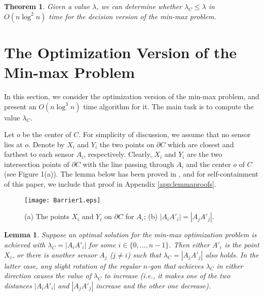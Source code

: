 \documentclass[11pt]{article}
\newtheorem{Theo}{Theorem}
\newtheorem{Lem}{Lemma}
\begin{document}
\begin{Theo}\label{theo:20}
Given a value $\lambda$, we can determine whether
$\lambda_C\leq\lambda$ in $O(n\log^2 n)$ time for the decision version
of the min-max problem.
\end{Theo}

\section{The Optimization Version of the Min-max Problem}
\label{sec:optimization}

In this section, we consider the optimization version of the min-max
problem, and present an $O(n\log^3 n)$ time algorithm for it.
The main task is to compute the value $\lambda_C$.

Let $o$ be the center of $C$. For simplicity of discussion, we assume that no sensor
lies at $o$.
Denote by $X_{i}$ and $Y_i$ the two points on $\partial C$ which are closest
and farthest to each sensor $A_{i}$, respectively.
Clearly, $X_{i}$ and $Y_i$ are the two intersection
points of $\partial C$ with the line passing through $A_{i}$ and the center $o$
of $C$ (see Figure 1(a)). The lemma below has been proved in
\cite{ref:TanNe10}, and for self-containment of this paper, we include that proof in
Appendix \ref{app:lemmaproofs}.

\begin{figure}[t]
\begin{center}
\texttt{[image: Barrier1.eps]}
\caption{(a) The points $X_i$ and $Y_i$ on $\partial C$ for $A_i$;
(b) $|A_{i} A'_{i}| = |A_{j} A'_{j}|$.}
\end{center}
\vspace*{-0.2in}
\end{figure}


\begin{Lem}\label{lem:10}\cite{ref:TanNe10}
Suppose an optimal solution for the min-max optimization problem is achieved
with $\lambda_C = |A_{i} A'_{i}|$ for some $i\in \{0,\ldots,
n-1\}$. Then either $A'_{i}$ is the point $X_{i}$, or there is
another sensor $A_{j}$ ($j \neq i$) such that $\lambda_C = |A_{j}
A'_{j}|$ also holds. In the latter case, any slight rotation of the
regular $n$-gon that achieves $\lambda_C$ in either direction
causes the value of $\lambda_C$ to increase (i.e., it makes one of the two
distances $|A_i A'_i|$ and $|A_j A'_j|$ increase and the other one decrease).
\end{Lem}
\end{document}
